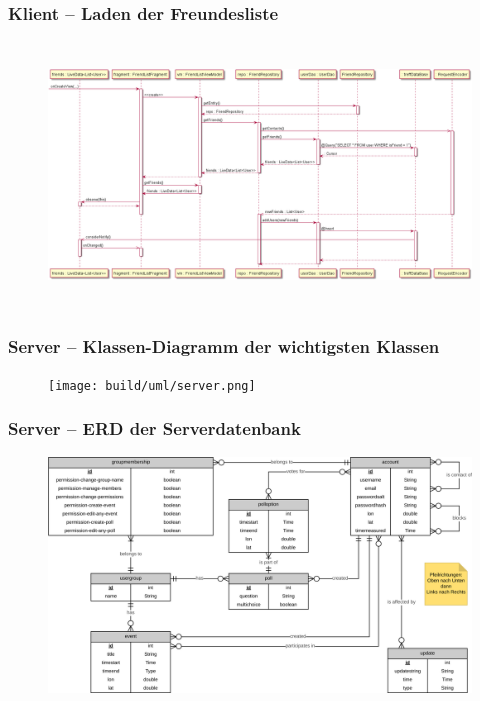 \documentclass[aspectratio=1610]{beamer}
\begin{document}
    \begin{frame}[plain]
        \frametitle{\textbf{Klient} -- Laden der Freundesliste}
        \begin{figure}[!htb]
            \centering
            \includegraphics[height = 200pt]{images/datafetch.png}
        \end{figure}
    \end{frame}


	\begin{frame}[plain]
        \frametitle{\textbf{Server} -- Klassen-Diagramm der wichtigsten Klassen}
        \begin{figure}[!htb]
            \centering
            \texttt{[image: build/uml/server.png]}
        \end{figure}
	\end{frame}

	\begin{frame}[plain]
        \frametitle{\textbf{Server} -- ERD der Serverdatenbank}
        \begin{figure}[!htb]
            \centering
            \includegraphics[width = \columnwidth]{images/erd-complete.png}
        \end{figure}
    \end{frame}
\end{document}
